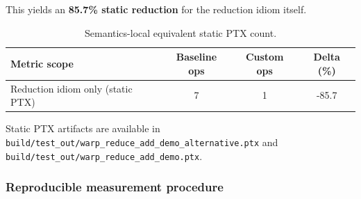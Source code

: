 \documentclass[11pt]{article}
\begin{document}
This yields an \textbf{85.7\% static reduction} for the reduction idiom
itself.

\begin{table}[htbp]
\centering
\caption{Semantics-local equivalent static PTX count.}
\label{tab:local-static-ptx-count}
\begin{tabular}{lccc}
\toprule
Metric scope & Baseline ops & Custom ops & Delta (\%) \\
\midrule
Reduction idiom only (static PTX) & 7 & 1 & -85.7 \\
\bottomrule
\end{tabular}
\end{table}

Static PTX artifacts are available in
\texttt{build/test\_out/warp\_reduce\_add\_demo\_alternative.ptx} and
\texttt{build/test\_out/warp\_reduce\_add\_demo.ptx}.

\hypertarget{reproducible-measurement-procedure}{%
\subsubsection{Reproducible measurement
procedure}\label{reproducible-measurement-procedure}}
\end{document}
